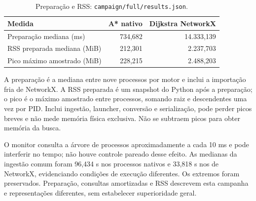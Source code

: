 \begin{table}[ht]
\centering
\caption{Preparação e RSS: \texttt{campaign/full/results.json}.}
\label{tab:prepared-benchmark}
\begin{tabular}{@{}lrr@{}}
\toprule Medida & A* nativo & Dijkstra NetworkX \\
\midrule
Preparação mediana (ms) & 734,682 & 14.333,139 \\
RSS preparada mediana (MiB) & 212,301 & 2.237,703 \\
Pico máximo amostrado (MiB) & 228,215 & 2.488,203 \\
\bottomrule
\end{tabular}
\end{table}

A preparação é a mediana entre nove processos por motor e inclui a importação fria de NetworkX. A RSS preparada é um snapshot do Python após a preparação; o pico é o máximo amostrado entre processos, somando raiz e descendentes uma vez por PID. Inclui ingestão, launcher, conversão e serialização, pode perder picos breves e não mede memória física exclusiva. Não se subtraem picos para obter memória da busca.

O monitor consulta a árvore de processos aproximadamente a cada 10 ms e pode interferir no tempo; não houve controle pareado desse efeito. As medianas da ingestão comum foram 96,434 s nos processos nativos e 33,818 s nos de NetworkX, evidenciando condições de execução diferentes. Os extremos foram preservados. Preparação, consultas amortizadas e RSS descrevem esta campanha e representações diferentes, sem estabelecer superioridade geral.
